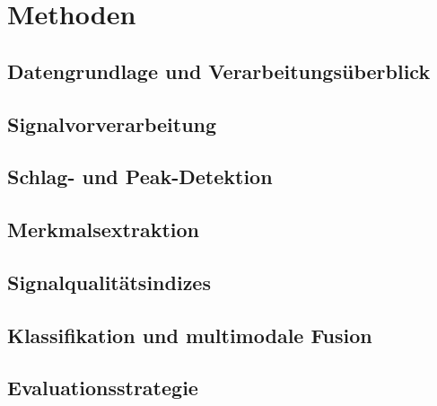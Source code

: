 \chapter{Methoden}
\section{Datengrundlage und Verarbeitungsüberblick}
\section{Signalvorverarbeitung}
\section{Schlag- und Peak-Detektion}
\section{Merkmalsextraktion}
\section{Signalqualitätsindizes}
\section{Klassifikation und multimodale Fusion}
\section{Evaluationsstrategie}
